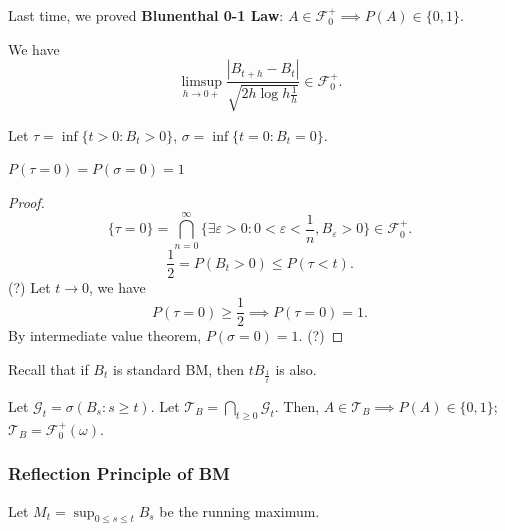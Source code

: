 
Last time, we proved \textbf{Blunenthal 0-1 Law}: $A \in \mathcal{F}_0^+ \implies P(A) \in \{0,1\} $.

We have
\[
	\limsup_{h \to 0+} \frac{|B_{t + h} - B_t|}{\sqrt{2 h \log h \frac{1}{h}} } \in \mathcal{F}_0^+
.\] 

Let $\tau = \inf \{t >0 : B_t > 0\} $, $\sigma = \inf \{t = 0: B_t = 0\} $.

\begin{theorem}
	$P(\tau = 0) = P(\sigma = 0) = 1$
\end{theorem}
\begin{proof}
	\[
		\{\tau = 0\}  = \bigcap_{n = 0} ^{\infty } 
		\{\exists \varepsilon>0: 0 < \varepsilon < \frac{1}{n}, B_\varepsilon > 0\} \in \mathcal{F}_0^+
	.\] 
	\[
		\frac{1}{2} = P(B_t > 0) \le  P(\tau < t)
	.\]
	(?) Let $t \to  0$, we have
	\[
		P(\tau =0) \ge  \frac{1}{2} \implies P(\tau = 0) = 1
	.\] 
	By intermediate value theorem, $P(\sigma = 0) = 1$. (?)
\end{proof}

Recall that if $B_t$ is standard BM, then $t B_{\frac{1}{t}}$ is also.

\begin{theorem}
	Let $\mathcal{G}_t = \sigma\left( B_s: s \ge t \right) $.
	Let $\mathcal{T}_B = \bigcap_{t\ge 0} \mathcal{G}_t$.
	Then, $A \in \mathcal{T}_B \implies P(A) \in \{0,1\} $; $\mathcal{T}_B = \mathcal{F}_0^+(\omega)$.
\end{theorem}

\subsubsection{Reflection Principle of BM}

Let $M_t = \sup_{0\le s\le t} B_s$ be the running maximum. 


